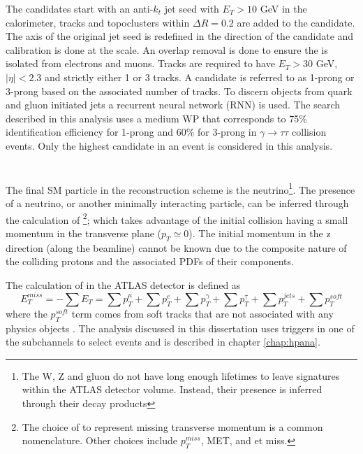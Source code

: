 	The \tauhad candidates start with an anti-$k_t$ jet seed with $E_T>10$ GeV in the calorimeter, tracks and topoclusters within $\Delta R = 0.2$ are added to the \tauhad candidate. The axis of the original jet seed is redefined in the direction of the \tauhad candidate and calibration is done at the \tauhad scale. An overlap removal is done to ensure the \tauhad is isolated from electrons and muons. Tracks are required to have $E_{T}>30$ GeV, $|\eta|<2.3$ and strictly either 1 or 3 tracks. A \tauhad candidate is referred to as 1-prong or 3-prong based on the associated number of tracks. To discern \tauhad objects from quark and gluon initiated jets a recurrent neural network (RNN) is used. The search described in this analysis uses a medium WP that corresponds to 75\% identification efficiency for 1-prong and 60\% for 3-prong in $\gamma \rightarrow \tau \tau$ collision events. Only the highest \pt \tauhad candidate in an event is considered in this analysis.

	\section{\Etm}\label{sec:reco-etmiss}
	The final SM particle in the reconstruction scheme is the neutrino\footnote{The W, Z and gluon do not have long enough lifetimes to leave signatures within the ATLAS detector volume. Instead, their presence is inferred through their decay products}. The presence of a neutrino, or another minimally interacting particle, can be inferred through the calculation of \Etm\footnote{The choice of \Etm to represent missing transverse momentum is a common nomenclature. Other choices include $p_{T}^{miss}$, MET, and et miss.}; which takes advantage of the initial collision having a small momentum in the transverse plane ($p_{T} \simeq 0$). The initial momentum in the z direction (along the beamline) cannot be known due to the composite nature of the colliding protons and the associated PDFs of their components.

	The calculation of \Etm in the ATLAS detector is defined as
	\begin{equation}\label{eqn:etmiss}
	E_{T}^{miss} = - \sum E_{T} = \sum p_{T}^{\mu} + \sum p_{T}^{e} + \sum p_{T}^{\gamma} + \sum p_{T}^{\tau} + \sum p_{T}^{jets} + \sum p_{T}^{soft}
	\end{equation}
	where the $p_{T}^{soft}$ term comes from soft tracks that are not associated with any physics objects \cite{met-perf}. The analysis discussed in this dissertation uses \Etm triggers in one of the subchannels to select events and is described in chapter \ref{chap:hpana}.